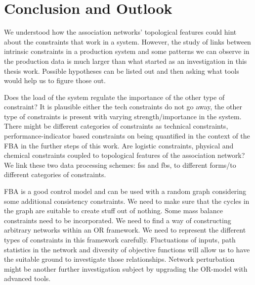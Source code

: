 \chapter{Conclusion and Outlook}
{\color{red} We understood how the association networks' topological features could hint about the constraints that work in a system. However, the study of links between intrinsic constraints in a production system and some patterns we can observe in the production data is much larger than what started as an investigation in this thesis work.
Possible hypotheses can be listed out and then asking what tools would help us to figure those out.

Does the load of the system regulate the importance of the other type of constraint? It is plausible either the tech constraints do not go away, the other type of constraints is present with varying strength/importance in the system. 
There might be different categories of constraints as technical constraints, performance-indicator based constraints on being quantified in the context of the FBA in the further steps of this work.
Are logistic constraints, physical and chemical constraints coupled to topological features of the association network?
We link these two data processing schemes: \acs{fss} and \acs{fbs}, to different forms/to different categories of constraints.

FBA is a good control model and can be used with a random graph considering some additional consistency constraints. We need to make sure that the cycles in the graph are suitable to create stuff out of nothing. Some mass balance constraints need to be incorporated. We need to find a way of constructing arbitrary networks within an OR framework. We need to represent the different types of constraints in this framework carefully. Fluctuations of inputs, path statistics in the network and diversity of objective functions will allow us to have the suitable ground to investigate those relationships.
Network perturbation might be another further investigation subject by upgrading the OR-model with advanced tools.

}
